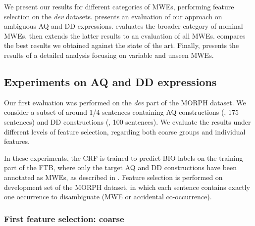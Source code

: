 \documentclass[output=paper,
modfonts
]{langscibook}
\begin{document}
We present our results for different categories of MWEs, performing  feature selection on the \emph{dev} datasets. 
 presents an evaluation of our approach on ambiguous AQ and DD expressions. 
 evaluates the broader category of nominal MWEs. 
 then extends the latter results to an evaluation of all MWEs. 
 compares the best results we obtained against the state of the art.
Finally,  presents the results of a detailed analysis focusing on variable and unseen MWEs.


\subsection{Experiments on AQ and DD expressions}
\label{schol:sec:results-ambig}

Our first evaluation was performed on the \emph{dev} part of the MORPH dataset. We consider a subset of around 1/4 sentences containing AQ constructions (\devAQ{}, 175 sentences) and DD constructions (\devDD{}, 100 sentences).
We evaluate the results under different levels of feature selection, regarding both coarse groups and individual features.

In these experiments, the CRF is trained to predict BIO labels on the training part of the FTB, where only the target AQ and DD constructions have been annotated as MWEs, as described in . Feature selection is performed on development set of the MORPH dataset, in which each sentence contains exactly one occurrence to disambiguate (MWE or accidental co-occurrence).


\subsubsection{First feature selection: coarse}
\label{subsec:results-ambig-feat-coarse}
\end{document}
